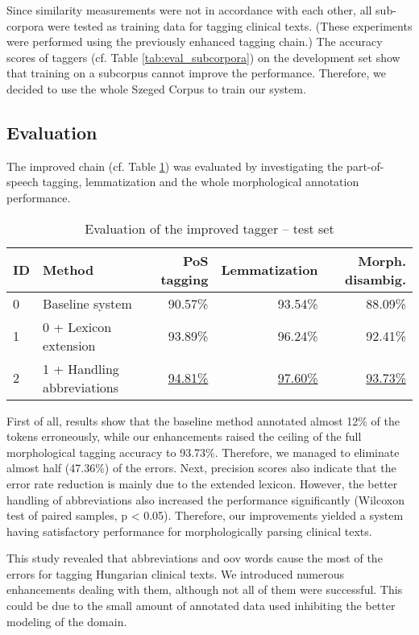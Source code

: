 Since similarity measurements were not in accordance with each other, all sub-corpora were tested as training data for tagging clinical texts. 
(These experiments were performed using the previously enhanced tagging chain.)
The accuracy scores of taggers (cf. Table  \ref{tab:eval_subcorpora}) on the development set show that training on a subcorpus cannot improve the performance. 
Therefore, we decided to use the whole Szeged Corpus to train our system.

\subsection{Evaluation}

The improved chain (cf. Table \ref{tab:improvements}) was evaluated by investigating the part-of-speech tagging, lemmatization and the whole morphological annotation performance.

\begin{table}[H]
\centering
\caption{Evaluation of the improved tagger -- test set}
\label{tab:improvements}
\begin{tabular}{ l l r r r} 
\hline
ID & Method & PoS tagging & Lemmatization & Morph. disambig. \\
\hline
0 & Baseline system & 90.57\% & 93.54\% & 88.09\% \\
1 & 0 + Lexicon extension & 93.89\% & 96.24\% & 92.41\% \\
2 & 1 + Handling abbreviations & \underline{94.81\%} & \underline{97.60\%} & \underline{93.73\%} \\
\hline
\end{tabular}
\end{table}

First of all, results show that the baseline method annotated almost 12\% of the tokens erroneously, while our enhancements raised the ceiling of the full morphological tagging accuracy to 93.73\%.
Therefore, we managed to eliminate almost half (47.36\%) of the errors. 
Next, precision scores also indicate that the error rate reduction is mainly due to the extended lexicon.
However, the better handling of abbreviations also increased the performance significantly (Wilcoxon test of paired samples, p < 0.05).
Therefore, our improvements yielded a system having satisfactory performance for morphologically parsing clinical texts.


This study revealed that abbreviations and \acrlong{oov} words cause the most of the errors for tagging Hungarian clinical texts.
We introduced numerous enhancements dealing with them, although not all of them were successful.
This could be due to the small amount of annotated data used inhibiting the better modeling of the domain.
